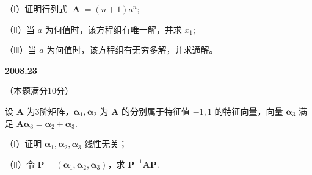 \documentclass[UTF8,12pt,fontset=windows]{ctexart}
\begin{document}
（Ⅰ）证明行列式 $|\boldsymbol{A}| = (n+1)a^n$;

（Ⅱ）当 $a$ 为何值时，该方程组有唯一解，并求 $x_1$;

（Ⅲ）当 $a$ 为何值时，该方程组有无穷多解，并求通解。

\vfill
\newpage
{\large\bfseries 2008.23}

（本题满分10分）

设 $\boldsymbol{A}$ 为3阶矩阵，$\boldsymbol{\alpha}_1, \boldsymbol{\alpha}_2$ 为 $\boldsymbol{A}$ 的分别属于特征值 $-1, 1$ 的特征向量，向量 $\boldsymbol{\alpha}_3$ 满足 $\boldsymbol{A\alpha}_3 = \boldsymbol{\alpha}_2 + \boldsymbol{\alpha}_3$.

（Ⅰ）证明 $\boldsymbol{\alpha}_1, \boldsymbol{\alpha}_2, \boldsymbol{\alpha}_3$ 线性无关；

（Ⅱ）令 $\boldsymbol{P} = (\boldsymbol{\alpha}_1, \boldsymbol{\alpha}_2, \boldsymbol{\alpha}_3)$，求 $\boldsymbol{P}^{-1}\boldsymbol{AP}$.

\vfill
\end{document}
